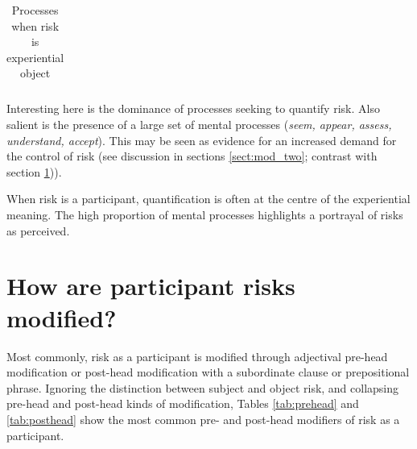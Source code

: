 \begin{table}[htb!]
{\begin{minipage}{.35\textwidth}
\begin{tabularx}{1.0\textwidth}{|>{\raggedright}X|l|}
    \end{tabularx}
    \caption{Processes when risk is experiential object}
    \label{tab:obj}
    \end{minipage}}
    \end{table}

    Interesting here is the dominance of processes seeking to quantify risk. Also salient is the presence of a large set of mental processes (\emph{seem, appear, assess, understand, accept}). This may be seen as evidence for an increased demand for the control of risk (see discussion in sections \ref{sect:mod_two}; contrast with section \ref{sect:highpotential})).


    \vspace{5mm}\noindent\begin{tcolorbox}[colback=yellow!5,colframe=yellow!40!black,title=Summary: processes with risk participants]
    \parbox{1\textwidth}{%
    When risk is a participant, quantification is often at the centre of the experiential meaning. The high proportion of mental processes highlights a portrayal of risks as perceived.}
    \end{tcolorbox}
    \vspace{5mm}

\section{How are participant risks modified?} \label{sect:highpotential} \FloatBarrier

    Most commonly, risk as a participant is modified through adjectival pre-head modification or post-head modification with a subordinate clause or prepositional phrase. Ignoring the distinction between subject and object risk, and collapsing pre-head and post-head kinds of modification, Tables \ref{tab:prehead} and \ref{tab:posthead} show the most common pre- and post-head modifiers of risk as a participant.

